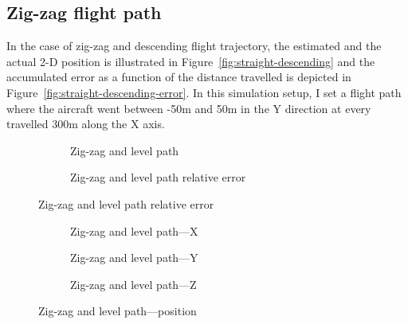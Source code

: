 \subsection{Zig-zag flight path}

In the case of zig-zag and descending flight trajectory, the estimated and the actual 2-D position is illustrated in Figure~\ref{fig:straight-descending} and the accumulated error as a function of the distance travelled is depicted in Figure~\ref{fig:straight-descending-error}. In this simulation setup, I set a flight path where the aircraft went between -50\si{\meter} and 50\si{\meter} in the Y direction at every travelled 300\si{\meter} along the X axis.

\begin{figure}[H]
    \centering
    \begin{subfigure}{0.45\textwidth}
        
        \caption{Zig-zag and level path}\label{fig:zig-zag-level}
    \end{subfigure}
    \begin{subfigure}{0.45\textwidth}
        
        \caption{Zig-zag and level path relative error}\label{fig:zig-zag-level-error}
    \end{subfigure}
\end{figure}

\begin{figure}[H]
    \centering
    \begin{subfigure}{0.3\textwidth}
        
        \caption{Zig-zag and level path---X}
    \end{subfigure}
    \hfill
    \begin{subfigure}{0.3\textwidth}
        
        \caption{Zig-zag and level path---Y}
    \end{subfigure}
    \hfill
    \begin{subfigure}{0.3\textwidth}
        
        \caption{Zig-zag and level path---Z}
    \end{subfigure}
    \caption{Zig-zag and level path---position}\label{fig:zig-zag-level-pos}
\end{figure}

